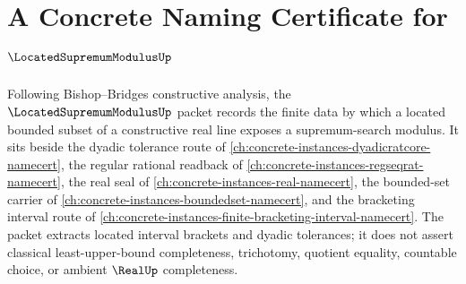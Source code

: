 \chapter{A Concrete Naming Certificate for $\LocatedSupremumModulusUp$}
\label{ch:concrete-instances-located-supremum-modulus-namecert}

Following Bishop--Bridges constructive analysis, the $\LocatedSupremumModulusUp$ packet records the finite data by which a located bounded subset of a constructive real line exposes a supremum-search modulus. It sits beside the dyadic tolerance route of \autoref{ch:concrete-instances-dyadicratcore-namecert}, the regular rational readback of \autoref{ch:concrete-instances-regseqrat-namecert}, the real seal of \autoref{ch:concrete-instances-real-namecert}, the bounded-set carrier of \autoref{ch:concrete-instances-boundedset-namecert}, and the bracketing interval route of \autoref{ch:concrete-instances-finite-bracketing-interval-namecert}. The packet extracts located interval brackets and dyadic tolerances; it does not assert classical least-upper-bound completeness, trichotomy, quotient equality, countable choice, or ambient $\RealUp$ completeness.


